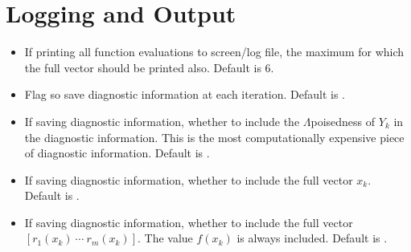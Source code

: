\documentclass[letterpaper,10pt,english]{sphinxmanual}
\begin{document}
\section{Logging and Output}
\label{\detokenize{advanced:logging-and-output}}\begin{itemize}
\item {} 
 \sphinxhyphen{} If printing all function evaluations to screen/log file, the maximum  for which the full vector  should be printed also. Default is 6.

\item {} 
 \sphinxhyphen{} Flag so save diagnostic information at each iteration. Default is .

\item {} 
 \sphinxhyphen{} If saving diagnostic information, whether to include the \(\Lambda\)\sphinxhyphen{}poisedness of \(Y_k\) in the diagnostic information. This is the most computationally expensive piece of diagnostic information. Default is .

\item {} 
 \sphinxhyphen{} If saving diagnostic information, whether to include the full vector \(x_k\). Default is .

\item {} 
 \sphinxhyphen{} If saving diagnostic information, whether to include the full vector \([r_1(x_k)\:\cdots\:r_m(x_k)]\). The value \(f(x_k)\) is always included. Default is .

\end{itemize}
\end{document}
